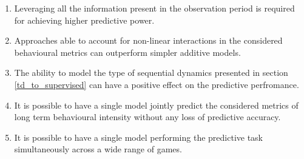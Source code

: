 \begin{enumerate}
    \item Leveraging all the information present in the observation period is required for achieving higher predictive power.
    \item Approaches able to account for non-linear interactions in the considered behavioural metrics can outperform simpler additive models.
    \item The ability to model the type of sequential dynamics presented in section \ref{td_to_supervised} can have a positive effect on the predictive perfromance.
    \item It is possible to have a single model jointly predict the considered metrics of long term behavioural intensity without any loss of predictive accuracy.
    \item It is possible to have a single model performing the predictive task simultaneously across a wide range of games.
\end{enumerate}

